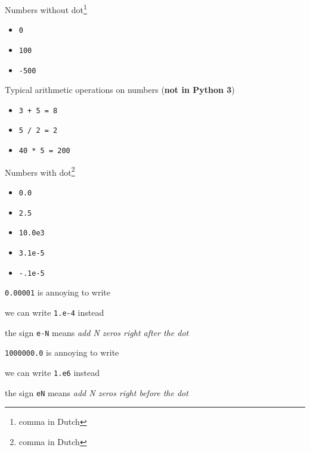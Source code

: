 \documentclass{beamer}
\begin{document}
\begin{slide}{
\item Numbers without dot\footnote{comma in Dutch}
\begin{itemize}
\item \texttt{0}
\item \texttt{100} 
\item \texttt{-500}
\end{itemize}
}\end{slide}

\begin{slide}{
\item Typical arithmetic operations on numbers (\textbf{not in Python 3})
\begin{itemize}
\item \texttt{3 + 5 = 8}
\item \texttt{5 / 2 = 2}
\item \texttt{40 * 5 = 200}
\end{itemize} 
}\end{slide}

\begin{slide}{
\item Numbers with dot\footnote{comma in Dutch}
\begin{itemize}
\item \texttt{0.0}
\item \texttt{2.5}
\item \texttt{10.0e3}
\item \texttt{3.1e-5}
\item \texttt{-.1e-5}
\end{itemize}
}\end{slide}

\begin{slide}{
\item \texttt{0.00001} is annoying to write
\item we can write \texttt{1.e-4} instead
\item the sign \texttt{e-N} means \textit{add N zeros right after the dot}
}\end{slide}

\begin{slide}{
\item \texttt{1000000.0} is annoying to write
\item we can write \texttt{1.e6} instead
\item the sign \texttt{eN} means \textit{add N zeros right before the dot}
}\end{slide}
\end{document}

